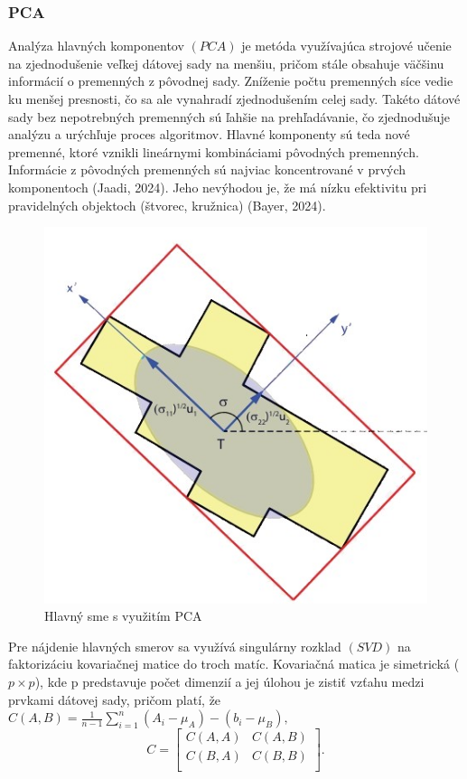 \documentclass[12pt]{article}
\begin{document}
\subsubsection*{PCA}
Analýza hlavných komponentov $(PCA)$ je metóda využívajúca strojové učenie na zjednodušenie veľkej dátovej sady na menšiu, pričom stále obsahuje väčšinu informácií o premenných z pôvodnej sady. Zníženie počtu premenných síce vedie ku menšej presnosti, čo sa ale vynahradí zjednodušením celej sady. Takéto dátové sady bez nepotrebných premenných sú ľahšie na prehľadávanie, čo zjednodušuje analýzu a urýchľuje proces algoritmov. Hlavné komponenty sú teda nové premenné, ktoré vznikli lineárnymi kombináciami pôvodných premenných. Informácie z pôvodných premenných sú najviac koncentrované v prvých komponentoch (Jaadi, 2024). Jeho nevýhodou je, že má nízku efektivitu pri pravidelných objektoch (štvorec, kružnica) (Bayer, 2024). 
\begin{figure}[h]
    \centering
    \includegraphics[width=0.56\linewidth]{latex/image/pca.jpg}
    \caption{Hlavný sme s využitím PCA}
    \label{fig:enter-label}
\end{figure}\par
Pre nájdenie hlavných smerov sa využívá singulárny rozklad $(SVD)$ na faktorizáciu kovariačnej matice do troch matíc. Kovariačná matica je simetrická ($p\times p$), kde p predstavuje počet dimenzií a jej úlohou je zistiť vzťahu medzi prvkami dátovej sady, pričom platí, že  $ C(A, B) = \frac{1}{n-1}\sum_{i=1}^{n}(A_{i}-\mu_{A}) -(b_{i}-\mu_{B}), $
$$$$$$
  C =
  \left[ {\begin{array}{cc} 
    C(A, A) & C(A, B) \\
    C(B, A) & C(B, B) \\
  \end{array} } \right].
$$ \\\par
\end{document}
